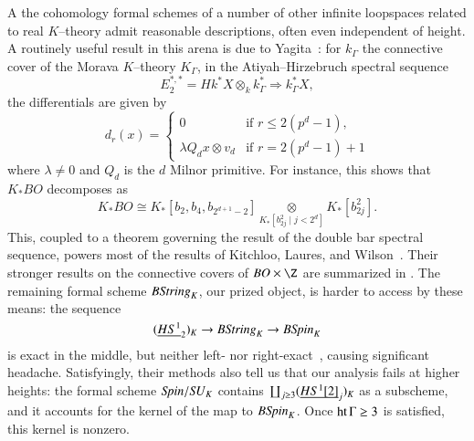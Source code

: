 \begin{remark}
A the cohomology formal schemes of a number of other infinite loopspaces related to real $K$--theory admit reasonable descriptions, often even independent of height.  A routinely useful result in this arena is due to Yagita~\cite[Lemma 2.1]{Yagita}: for $k_\Gamma$ the connective cover of the Morava $K$--theory $K_\Gamma$, in the Atiyah--Hirzebruch spectral sequence \[E_2^{*, *} = Hk^* X \otimes_k k_\Gamma^* \Rightarrow k_\Gamma^* X,\] the differentials are given by \[d_r(x) = \begin{cases} 0 & \text{if $r \le 2(p^d - 1)$}, \\ \lambda Q_d x \otimes v_d & \text{if $r = 2(p^d - 1) + 1$} \end{cases}\] where $\lambda \ne 0$ and $Q_d$ is the $d${\th} Milnor primitive.  For instance, this shows that $K_* BO$ decomposes as \[K_* BO \cong K_*[b_2, b_4, b_{2^{d+1}-2}] \underset{K_*[b_{2j}^2 \mid j < 2^d]}{\otimes} K_*[b_{2j}^2].\]  This, coupled to a theorem governing the result of the double bar spectral sequence, powers most of the results of Kitchloo, Laures, and Wilson~\cite[Section 4]{KLW}.  Their stronger results on the connective covers of $BO \times \Z$ are summarized in .  The remaining formal scheme $B\mathit{String}_K$, our prized object, is harder to access by these means: the sequence \[(\underline{\smash{HS^1}}_{2})_K \to B\mathit{String}_K \to B\mathit{Spin}_K\] is exact in the middle, but neither left- nor right-exact~\cite[pg.\ 234]{KLW}, causing significant headache.  Satisfyingly, their methods also tell us that our analysis fails at higher heights: the formal scheme $\mathit{Spin}/\mathit{SU}_K$ contains $\coprod_{j \ge 3} (\underline{\smash{HS^1[2]}}_{j})_K$ as a subscheme, and it accounts for the kernel of the map to $B\mathit{Spin}_K$.  Once $\operatorname{ht} \Gamma \ge 3$ is satisfied, this kernel is nonzero.
\end{remark}

